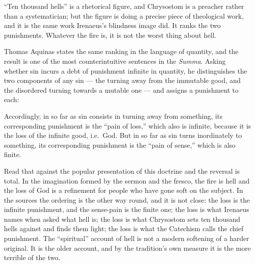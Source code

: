 ``Ten thousand hells'' is a rhetorical figure, and Chrysostom is a preacher rather than a systematician; but the figure is doing a precise piece of theological work, and it is the same work Irenaeus's blindness image did. It ranks the two punishments. Whatever the fire is, it is not the worst thing about hell.

Thomas Aquinas states the same ranking in the language of quantity, and the result is one of the most counterintuitive sentences in the \emph{Summa}. Asking whether sin incurs a debt of punishment infinite in quantity, he distinguishes the two components of any sin --- the turning away from the immutable good, and the disordered turning towards a mutable one --- and assigns a punishment to each:

\begin{studyframe}
Accordingly, in so far as sin consists in turning away from something, its corresponding punishment is the ``pain of loss,'' which also is infinite, because it is the loss of the infinite good, i.e.\ God. But in so far as sin turns inordinately to something, its corresponding punishment is the ``pain of sense,'' which is also finite.
\end{studyframe}

Read that against the popular presentation of this doctrine and the reversal is total. In the imagination formed by the sermon and the fresco, the fire is hell and the loss of God is a refinement for people who have gone soft on the subject. In the sources the ordering is the other way round, and it is not close: the loss is the infinite punishment, and the sense-pain is the finite one; the loss is what Irenaeus names when asked what hell is; the loss is what Chrysostom sets ten thousand hells against and finds them light; the loss is what the Catechism calls the chief punishment. The ``spiritual'' account of hell is not a modern softening of a harder original. It is the older account, and by the tradition's own measure it is the more terrible of the two.

